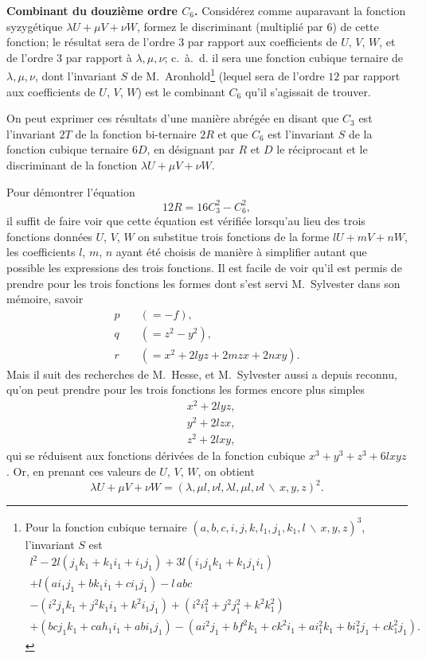 \documentclass[11pt,a4paper]{article}
\theoremstyle{definition}
\begin{document}
\textbf{Combinant du douzi\`{e}me ordre $C_{6}$.} Consid\'{e}rez comme auparavant la fonction
syzyg\'{e}tique $\lambda U + \mu V + \nu W$, formez le discriminant (multipli\'{e} par $6$) de
 cette fonction; le r\'{e}sultat sera de l'ordre $3$ par rapport aux coefficients de $U$, $V$, $W$,
et de l'ordre $3$ par rapport \`{a} $\lambda, \mu, \nu$; c.~\`{a}.~d. il sera une fonction cubique
ternaire de $\lambda, \mu, \nu$, dont l'invariant $S$ de M.~Aronhold\footnote{Pour la fonction
cubique ternaire $(a,b,c,i,j,k,l_{1},j_{1},k_{1},l\,\backslash\!\!\,x,y,z)^{3}$, l'invariant $S$ est
\begin{multline*}
l^{2} - 2l(j_{1}k_{1}+k_{1}i_{1}+i_{1}j_{1}) + 3l(i_{1}j_{1}k_{1}+k_{1}j_{1}i_{1}) \\
+ l(ai_{1}j_{1}+bk_{1}i_{1}+ci_{1}j_{1}) - l\,abc \\
- (i^{2}j_{1}k_{1}+j^{2}k_{1}i_{1}+k^{2}i_{1}j_{1})
+ (i^{2}i_{1}^{2}+j^{2}j_{1}^{2}+k^{2}k_{1}^{2}) \\
+ (bcj_{1}k_{1}+cah_{1}i_{1}+abi_{1}j_{1})
- (ai^{2}j_{1}+bf^{2}k_{1}+ck^{2}i_{1}+ai_{1}^{2}k_{1}+bi_{1}^{2}j_{1}+ck_{1}^{2}j_{1}).
\end{multline*}}
(lequel sera de l'ordre $12$ par rapport aux coefficients de $U$, $V$, $W$) est le
combinant $C_{6}$ qu'il s'agissait de trouver.

On peut exprimer ces r\'{e}sultats d'une mani\`{e}re abr\'{e}g\'{e}e en disant que $C_{3}$ est
l'invariant $2T$ de la fonction bi-ternaire $2R$ et que $C_{6}$ est l'invariant $S$ de la
fonction cubique ternaire $6D$, en d\'{e}signant par $R$ et $D$ le r\'{e}ciprocant et le
discriminant de la fonction $\lambda U + \mu V + \nu W$.

Pour d\'{e}montrer l'\'{e}quation
\[12R = 16C_{3}^{2} - C_{6}^{2},\]
il suffit de faire voir que cette \'{e}quation est v\'{e}rifi\'{e}e lorsqu'au lieu des trois fonctions
donn\'{e}es $U$, $V$, $W$ on substitue trois fonctions de la forme $lU + mV + nW$, les
coefficients $l$, $m$, $n$ ayant \'{e}t\'{e} choisis de mani\`{e}re \`{a} simplifier autant que possible les
expressions des trois fonctions. Il est facile de voir qu'il est permis de prendre pour
les trois fonctions les formes dont s'est servi M.~Sylvester dans son m\'{e}moire, savoir
\[
\begin{aligned}
p\quad &(= -f),\\
q\quad &(= z^{2} - y^{2}),\\
r\quad &(= x^{2} + 2lyz + 2mzx + 2nxy).
\end{aligned}
\]
Mais il suit des recherches de M.~Hesse, et M.~Sylvester aussi a depuis reconnu, qu'on
peut prendre pour les trois fonctions les formes encore plus simples
\[
\begin{aligned}
&x^{2} + 2lyz,\\
&y^{2} + 2lzx,\\
&z^{2} + 2lxy,
\end{aligned}
\]
qui se r\'{e}duisent aux fonctions d\'{e}riv\'{e}es de la fonction cubique $x^{3} + y^{3} + z^{3} + 6lxyz$.
Or, en prenant ces valeurs de $U$, $V$, $W$, on obtient
\[\lambda U + \mu V + \nu W = (\lambda, \mu l, \nu l, \lambda l, \mu l, \nu l\,\backslash\!\!\,x,y,z)^{2}.\]
\end{document}
